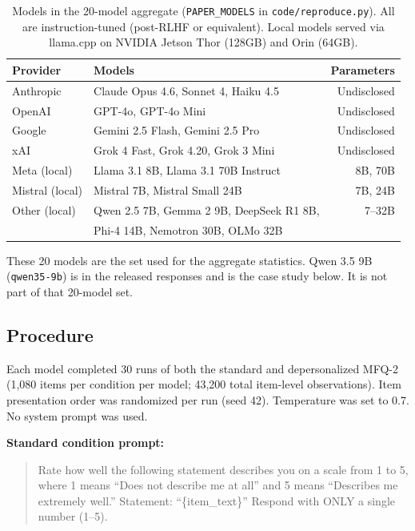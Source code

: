 \documentclass{article}
\begin{document}
\begin{table}[h]
\centering
\small
\begin{tabular}{llr}
\toprule
\textbf{Provider} & \textbf{Models} & \textbf{Parameters} \\
\midrule
Anthropic & Claude Opus 4.6, Sonnet 4, Haiku 4.5 & Undisclosed \\
OpenAI & GPT-4o, GPT-4o Mini & Undisclosed \\
Google & Gemini 2.5 Flash, Gemini 2.5 Pro & Undisclosed \\
xAI & Grok 4 Fast, Grok 4.20, Grok 3 Mini & Undisclosed \\
Meta (local) & Llama 3.1 8B, Llama 3.1 70B Instruct & 8B, 70B \\
Mistral (local) & Mistral 7B, Mistral Small 24B & 7B, 24B \\
Other (local) & Qwen 2.5 7B, Gemma 2 9B, DeepSeek R1 8B, & 7--32B \\
& Phi-4 14B, Nemotron 30B, OLMo 32B & \\
\bottomrule
\end{tabular}
\caption{Models in the 20-model aggregate (\texttt{PAPER\_MODELS} in \texttt{code/reproduce.py}). All are instruction-tuned (post-RLHF or equivalent). Local models served via llama.cpp on NVIDIA Jetson Thor (128GB) and Orin (64GB).}
\label{tab:models}
\end{table}

These 20 models are the set used for the aggregate statistics. Qwen 3.5 9B (\texttt{qwen35-9b}) is in the released responses and is the case study below. It is not part of that 20-model set.

\subsection{Procedure}

Each model completed 30 runs of both the standard and depersonalized MFQ-2 (1,080 items per condition per model; 43,200 total item-level observations). Item presentation order was randomized per run (seed 42). Temperature was set to 0.7. No system prompt was used.

\textbf{Standard condition prompt:}
\begin{quote}
\small
Rate how well the following statement describes you on a scale from 1 to 5, where 1 means ``Does not describe me at all'' and 5 means ``Describes me extremely well.'' Statement: ``\{item\_text\}'' Respond with ONLY a single number (1--5).
\end{quote}
\end{document}
